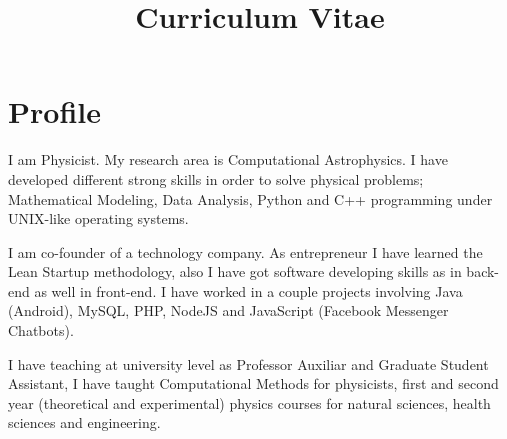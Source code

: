 \documentclass[12pt,letterpaper,sans]{moderncv}
\title{Curriculum Vitae}
\newcommand{\forceindent}{\leavevmode{\parindent=1em\indent}}
\begin{document}
%
%
%
%





\makecvtitle %



\section{Profile}

I am Physicist. My research area is Computational Astrophysics. I have developed different 
strong skills in order to solve physical problems; Mathematical Modeling, Data Analysis, 
Python and C++ programming under UNIX-like operating systems. 
\par
\forceindent I am co-founder of a technology company. As entrepreneur I have learned the
Lean Startup methodology, also I have got software developing skills as in back-end as 
well in front-end. I have worked in a couple projects involving Java (Android), MySQL, 
PHP, NodeJS and JavaScript (Facebook Messenger Chatbots).
\par
\forceindent I have teaching at university level as Professor Auxiliar and Graduate Student 
Assistant, I have taught Computational Methods for physicists, first and second year 
(theoretical and experimental) physics courses for natural sciences, health sciences and 
engineering.
\end{document}

